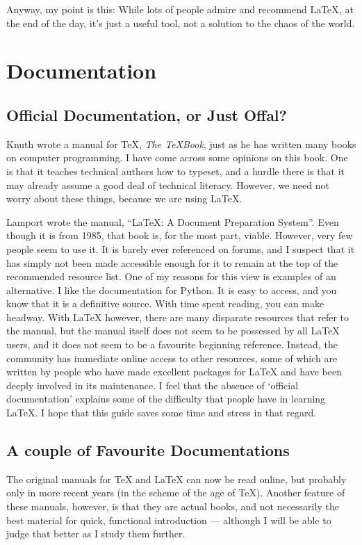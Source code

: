 \documentclass[11pt, oneside]{memoir}
\begin{document}
Anyway, my point is this: While lots of people admire and recommend LaTeX, at the end of the day, it's just a useful tool, not a solution to the chaos of the world.

\chapter{Documentation}
\section{Official Documentation, or Just Offal?}

Knuth wrote a manual for TeX, \emph{The TeXBook}, just as he has written many books on computer programming. I have come across some opinions on this book. One is that it teaches technical authors how to typeset, and a hurdle there is that it may already assume a good deal of technical literacy. However, we need not worry about these things, because we are using LaTeX.

Lamport wrote the manual, ``LaTeX: A Document Preparation System''. Even though it is from 1985, that book is, for the most part, viable. However, very few people seem to use it. It is barely ever referenced on forums, and I suspect that it has simply not been made accessible enough for it to remain at the top of the recommended resource list. One of my reasons for this view is examples of an alternative. I like the documentation for Python. It is easy to access, and you know that it is a definitive source. With time spent reading, you can make headway. With LaTeX however, there are many disparate resources that refer to the manual, but the manual itself does not seem to be possessed by all LaTeX users, and it does not seem to be a favourite beginning reference. Instead, the community has immediate online access to other resources, some of which are written by people who have made excellent packages for LaTeX and have been deeply involved in its maintenance. I feel that the absence of `official documentation' explains some of the difficulty that people have in learning LaTeX. I hope that this guide saves some time and stress in that regard.

\section{A couple of Favourite Documentations}
The original manuals for TeX and LaTeX can now be read online, but probably only in more recent years (in the scheme of the age of TeX). Another feature of these manuals, however, is that they are actual books, and not necessarily the best material for quick, functional introduction — although I will be able to judge that better as I study them further.
\end{document}
